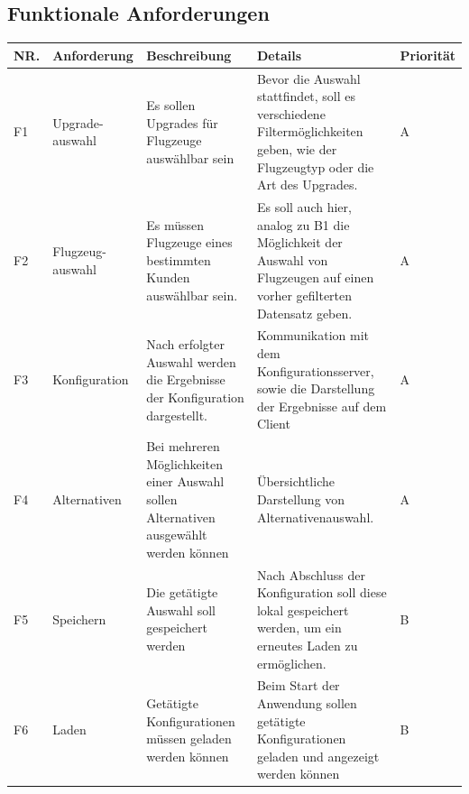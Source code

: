 \subsection{Funktionale Anforderungen}
\begin{tabular}[H]{| p{0.4cm} | p{2.3cm} | p{4.5cm} | p{5.3cm} | p{1.3cm} |}
\toprule[2pt] \rowcolor{dunkelgrau}
\hline
  NR. & Anforderung & Beschreibung & Details & Priorität \\
  \hline
  F1 & Upgrade-auswahl & Es sollen Upgrades für Flugzeuge auswählbar sein & Bevor die Auswahl stattfindet, soll es verschiedene Filtermöglichkeiten geben, wie der Flugzeugtyp oder die Art des Upgrades.
   & A \\
  \hline
  F2 & Flugzeug-auswahl & Es müssen Flugzeuge eines bestimmten Kunden auswählbar sein. & Es soll auch hier, analog zu B1 die Möglichkeit der Auswahl von Flugzeugen auf einen vorher gefilterten Datensatz geben. & A \\
  \hline
    F3 & Konfiguration & Nach erfolgter Auswahl werden die Ergebnisse der Konfiguration dargestellt. & Kommunikation mit dem Konfigurationsserver, sowie die Darstellung der Ergebnisse auf dem Client& A \\
    \hline
     F4 & Alternativen & Bei mehreren Möglichkeiten einer Auswahl sollen Alternativen ausgewählt werden können & Übersichtliche Darstellung von Alternativenauswahl.& A \\
        \hline
    F5 & Speichern & Die getätigte Auswahl soll gespeichert werden& Nach Abschluss der Konfiguration soll diese lokal gespeichert werden, um ein erneutes Laden zu ermöglichen. & B\\
    \hline
    F6 & Laden & Getätigte Konfigurationen müssen geladen werden können& Beim Start der Anwendung sollen getätigte Konfigurationen geladen und angezeigt werden können & B\\
    \hline
\bottomrule[2pt]
\end{tabular}






